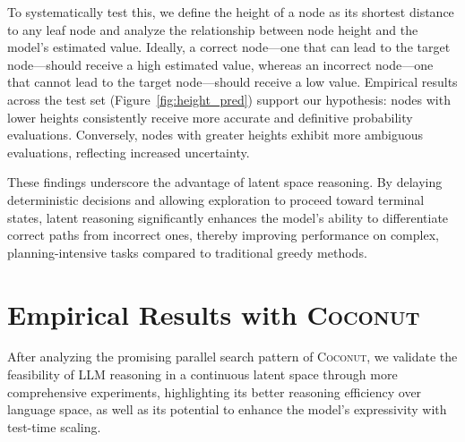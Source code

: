 \documentclass[]{fairmeta}
\newcommand{\ours}{\textsc{Coconut}\xspace}
\begin{document}
To systematically test this, we define the height of a node as its shortest distance to any leaf node and analyze the relationship between node height and the model's estimated value. Ideally, a correct node—one that can lead to the target node—should receive a high estimated value, whereas an incorrect node—one that cannot lead to the target node—should receive a low value. Empirical results across the test set (Figure~\ref{fig:height_pred}) support our hypothesis: nodes with lower heights consistently receive more accurate and definitive probability evaluations. Conversely, nodes with greater heights exhibit more ambiguous evaluations, reflecting increased uncertainty.

These findings underscore the advantage of latent space reasoning. By delaying deterministic decisions and allowing exploration to proceed toward terminal states, latent reasoning significantly enhances the model’s ability to differentiate correct paths from incorrect ones, thereby improving performance on complex, planning-intensive tasks compared to traditional greedy methods. %


\section{Empirical Results with \ours}
\label{sec:experiment}
After analyzing the promising parallel search pattern of \ours, we validate the feasibility of LLM reasoning in a continuous latent space through more comprehensive experiments, highlighting its better reasoning efficiency over language space, as well as its potential to enhance the model's expressivity with test-time scaling.
\end{document}
